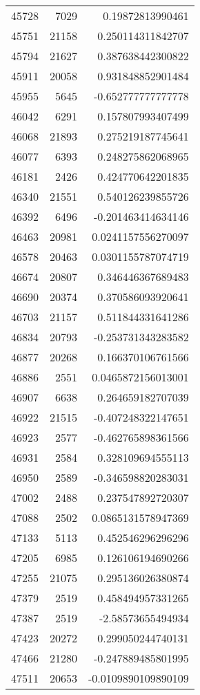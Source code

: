 \begin{tabular}{r | r | r}
45728 & 7029 & 0.19872813990461 \\
45751 & 21158 & 0.250114311842707 \\
45794 & 21627 & 0.387638442300822 \\
45911 & 20058 & 0.931848852901484 \\
45955 & 5645 & -0.652777777777778 \\
46042 & 6291 & 0.157807993407499 \\
46068 & 21893 & 0.275219187745641 \\
46077 & 6393 & 0.248275862068965 \\
46181 & 2426 & 0.424770642201835 \\
46340 & 21551 & 0.540126239855726 \\
46392 & 6496 & -0.201463414634146 \\
46463 & 20981 & 0.0241157556270097 \\
46578 & 20463 & 0.0301155787074719 \\
46674 & 20807 & 0.346446367689483 \\
46690 & 20374 & 0.370586093920641 \\
46703 & 21157 & 0.511844331641286 \\
46834 & 20793 & -0.253731343283582 \\
46877 & 20268 & 0.166370106761566 \\
46886 & 2551 & 0.0465872156013001 \\
46907 & 6638 & 0.264659182707039 \\
46922 & 21515 & -0.407248322147651 \\
46923 & 2577 & -0.462765898361566 \\
46931 & 2584 & 0.328109694555113 \\
46950 & 2589 & -0.346598820283031 \\
47002 & 2488 & 0.237547892720307 \\
47088 & 2502 & 0.0865131578947369 \\
47133 & 5113 & 0.452546296296296 \\
47205 & 6985 & 0.126106194690266 \\
47255 & 21075 & 0.295136026380874 \\
47379 & 2519 & 0.458494957331265 \\
47387 & 2519 & -2.58573655494934 \\
47423 & 20272 & 0.299050244740131 \\
47466 & 21280 & -0.247889485801995 \\
47511 & 20653 & -0.0109890109890109 \\

\end{tabular}
